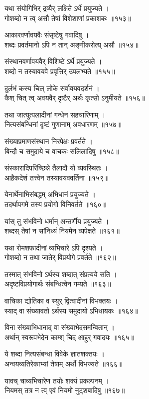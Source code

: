 यथा संयोगिभिर् द्रव्यैर् लक्षिते ऽर्थे प्रयुज्यते ।\\गोशब्दो न त्व् असौ तेषां विशेशाणां प्रकाशकः ॥१५३॥

आकारवर्णावयवैः संसृष्टेषु गवादिषु ।\\शब्दः प्रवर्तमानो ऽपि न तान् अङ्गीकरोत्य् असौ ॥१५४॥

संस्थानवर्णावयवैर् विशिष्टे ऽर्थे प्रयुज्यते ।\\शब्दो न तस्यावयवे प्रवृत्तिर् उपलभ्यते ॥१५५॥

दुर्लभं कस्य चिल् लोके सर्वावयवदर्शनं ।\\कैश् चित् त्व् अवयवैर् दृष्टैर् अर्थः कृत्सो ऽनुमीयते ॥१५६॥

तथा जात्युत्पलादीनां गन्धेन सहचारिणाम् ।\\नित्यसंबन्धिनां दृष्टं गुणानाम् अवधारणम् ॥१५७॥

संख्याप्रमाणसंस्थान निरपेक्षः प्रवर्तते ।\\बिन्दौ च समुदाये च वाचकः सलिलादिषु ॥१५८॥

संस्कारादिपरिच्छिन्ने तैलादौ यो व्यवस्थितः ।\\आहैकदेशं तत्त्वेन तस्यावयववर्तिना ॥१५९॥

येनार्थेनाभिसंबद्धम् अभिधानं प्रयुज्यते ।\\तदर्थापगमे तस्य प्रयोगो विनिवर्तते ॥१६०॥

यांस् तु संभविनो धर्मान् अन्तर्णीय प्रयुज्यते ।\\शब्दस् तेषां न सांनिध्यं नियमेन व्यपेक्षते ॥१६१॥

यथा रोमशफादीनां व्यभिचारे ऽपि दृश्यते ।\\गोशब्दो न तथा जातेर् विप्रयोगे प्रवर्तते ॥१६२॥

तस्मात् संभविनो ऽर्थस्य शब्दात् संप्रत्यये सति ।\\अदृष्टविप्रयोगार्थः संबन्धित्वेन गम्यते ॥१६३॥

वाचिका द्योतिका व स्युर् द्वित्वादीनां विभक्तयः ।\\स्याद् वा संख्यावतो ऽर्थस्य समुदायो ऽभिधायकः ॥१६४॥

विना संख्याभिधानाद् वा संख्याभेदसमन्वितान् ।\\अर्थान् स्वरूपभेदेन काम्श् चिद् आहुर् गवादयः ॥१६५॥

ये शब्दा नित्यसंबन्धा विवेके ज्ञातशक्तयः ।\\अन्वयव्यतिरेकाभ्यां तेषाम् अर्थो विभज्यते ॥१६६॥

यावच् चाव्यभिचारेण तयोः शक्यं प्रकल्पनम् ।\\नियमस् तत्र न त्व् एवं नियमो नुट्शबादिषु ॥१६७॥

